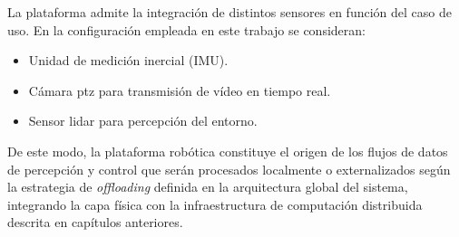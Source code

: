 La plataforma admite la integración de distintos sensores en función del caso de uso. En la configuración empleada en este trabajo se consideran:
\begin{itemize}
    \item Unidad de medición inercial (IMU).
    \item Cámara \gls{ptz} para transmisión de vídeo en tiempo real.
    \item Sensor \gls{lidar} para percepción del entorno.
\end{itemize}

De este modo, la plataforma robótica constituye el origen de los flujos de datos de percepción y control que serán procesados localmente o externalizados según la estrategia de \textit{offloading} definida en la arquitectura global del sistema, integrando la capa física con la infraestructura de computación distribuida descrita en capítulos anteriores.